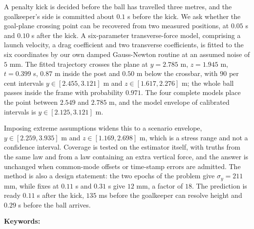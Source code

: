 \begin{titlepage}
{\setlength{\leftskip}{0.05\textwidth}%
 \setlength{\rightskip}{0.05\textwidth}%
 \setlength{\parindent}{0pt}%
A penalty kick is decided before the ball has travelled three metres, and the
goalkeeper's side is committed about $0.1$ s before the kick. We ask whether the
goal-plane crossing point can be recovered from two measured positions, at
$0.05$ s and $0.10$ s after the kick. A six-parameter transverse-force model,
comprising a launch velocity, a drag coefficient and two transverse
coefficients, is fitted to the six coordinates by our own damped Gauss-Newton
routine at an assumed noise of $5$ mm. The fitted trajectory crosses the plane
at $y=2.785$ m, $z=1.945$ m, $t=0.399$ s, $0.87$ m inside the post and $0.50$ m
below the crossbar, with $90$ per cent intervals $y\in[2.455,3.121]$ m and
$z\in[1.617,2.276]$ m; the whole ball passes inside the frame with probability
$0.971$. The four complete models place the point between $2.549$ and
$2.785$ m, and the model envelope of calibrated intervals is
$y\in[2.125,3.121]$ m.

Imposing extreme assumptions widens this to a scenario envelope,
$y\in[2.259,3.935]$ m and $z\in[1.169,2.698]$ m, which is a stress range and not
a confidence interval. Coverage is tested on the estimator itself, with truths
from the same law and from a law containing an extra vertical force, and the
answer is unchanged when common-mode offsets or time-stamp errors are admitted.
The method
is also a design statement: the two epochs of the problem give
$\sigma_y=211$ mm, while fixes at $0.11$ s and $0.31$ s give $12$ mm, a factor of
$18$. The prediction is ready $0.11$ s after the kick, $135$ ms before the
goalkeeper can resolve height and $0.29$ s before the ball arrives.\par}

\ifkeywords
  \vspace{1.0em}
  \begingroup
  \setlength{\leftskip}{0.05\textwidth}%
  \setlength{\rightskip}{0.05\textwidth}%
  \setlength{\parindent}{0pt}%
  \noindent\textbf{Keywords:}~\keywords\par
  \endgroup
\fi

\vfill
\end{titlepage}
\setcounter{page}{2}%
